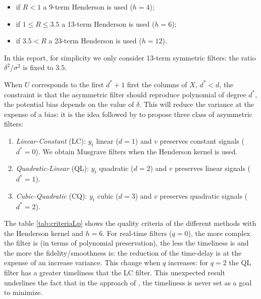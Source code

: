 \documentclass[
  12pt,
  ,
  a4paper]{article}
\newcommand\1{\mathds{1}}
\begin{document}
\begin{itemize}
\item
  if \(R<1\) a 9-term Henderson is used (\(h=4\));
\item
  if \(1\leq R\leq3.5\) a 13-term Henderson is used (\(h=6\));
\item
  if \(3.5< R\) a 23-term Henderson is used (\(h=12\)).
\end{itemize}

In this report, for simplicity we only consider 13-term symmetric filters: the ratio \(\delta^2/\sigma^2\) is fixed to \(3.5\).

When \(U\) corresponds to the first \(d^*+1\) first the columns of \(X\), \(d^*<d\), the constraint is that the asymmetric filter should reproduce polynomial of degree \(d^*\), the potential bias depends on the value of \(\delta\).
This will reduce the variance at the expense of a bias: it is the idea followed by \textcite{proietti2008} to propose three class of asymmetric filters:

\begin{enumerate}
\def\labelenumi{\arabic{enumi}.}
\item
  \emph{Linear-Constant} (LC): \(y_t\) linear (\(d=1\)) and \(v\) preserves constant signals (\(d^*=0\)).
  We obtain Musgrave filters when the Henderson kernel is used.
\item
  \emph{Quadratic-Linear} (QL): \(y_t\) quadratic (\(d=2\)) and \(v\) preserves linear signals (\(d^*=1\)).
\item
  \emph{Cubic-Quadratic} (CQ): \(y_t\) cubic (\(d=3\)) and \(v\) preserves quadratic signals (\(d^*=2\)).
\end{enumerate}

The table \ref{tab:criteriaLp} shows the quality criteria of the different methods with the Henderson kernel and \(h=6\).
For real-time filters (\(q=0\)), the more complex the filter is (in terms of polynomial preservation), the less the timeliness is and the more the fidelity/smoothness is: the reduction of the time-delay is at the expense of an increase variance.
This change when \(q\) increases: for \(q=2\) the QL filter has a greater timeliness that the LC filter.
This unexpected result underlines the fact that in the approach of \textcite{proietti2008}, the timeliness is never set as a goal to minimize.
\end{document}
